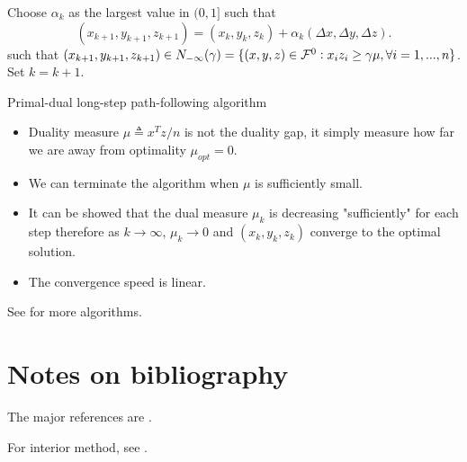 \begin{refsection}
\begin{algorithm}[H]
{		Choose $\alpha_k$ as the largest value in $ (0,1]$ such that 
		$$(x_{k+1},y_{k+1},z_{k+1}) = (x_k,y_k,z_k) + \alpha_k(\Delta x, \Delta y, \Delta z).$$		
		such that  $(x_{k+1},y_{k+1}, z_{k+1})\in N_{-\infty}(\gamma) = \{(x,y,z) \in \mathcal{F}^0: x_iz_i\geq \gamma \mu, \forall i=1,...,n \} $.\\
		Set $k = k+1$.	
	}
	\caption{Primal-dual long-step path-following algorithm}
\end{algorithm}


\begin{remark}[interpretation]\hfill
\begin{itemize}
	\item Duality measure $\mu \triangleq x^Tz/n$ is not the duality gap, it simply measure how far we are away from optimality $\mu_{opt} = 0$.
	\item We can terminate the algorithm when $\mu$ is sufficiently small.
\end{itemize}
\end{remark}


\begin{remark}[convergence]\cite[406]{nocedal2006numerical}
\begin{itemize}
	\item It can be showed that the dual measure $\mu_k$ is decreasing "sufficiently" for each step therefore as $k\to \infty$, $\mu_k\to 0$ and $(x_k,y_k,z_k)$ converge to the optimal solution.
	\item The convergence speed is linear. 
\end{itemize}
\end{remark}

\begin{remark}
See \cite[406]{nocedal2006numerical} for more algorithms.
\end{remark}


\section{Notes on bibliography}
The major references are \cite{Robinson2015nonlinear2}
\cite{luenberger2015linear}
\cite{bertsimas1997introduction}.

For interior method, see \cite{nocedal2006numerical}.
\printbibliography

\end{refsection}
